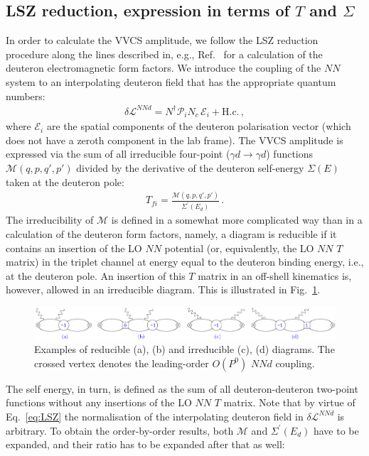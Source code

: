 \documentclass[prl,
twocolumn,
showpacs,preprintnumbers,amsmath,amssymb,
superscriptaddress,
a4paper,nofootinbib,longbibliography]{revtex4-2}
\begin{document}
\subsection{LSZ reduction, expression in terms of $T$ and $\Sigma$}
In order to calculate the VVCS amplitude, we follow the LSZ reduction procedure along the lines described in, e.g., Ref.~\cite{Kaplan:1998sz} for a calculation of the deuteron electromagnetic form factors. We introduce the coupling of the $NN$ system to an interpolating deuteron field that has the appropriate quantum numbers:
\begin{align}
    \delta\mathcal{L}^{NNd}= N^\dagger \mathcal{P}_i N_c\, \mathcal{E}_i+\text{H.c.}\,, 
\end{align}
where $\mathcal{E}_i$ are the spatial components of the deuteron polarisation vector (which does not have a zeroth component in the lab frame). The VVCS amplitude is expressed via the sum of all irreducible four-point ($\gamma d\to \gamma d$) functions $\mathcal{M}(q,p,q',p')$ divided by the derivative of the deuteron self-energy $\Sigma(E)$ taken at the deuteron pole:
\begin{align}
    T_{fi} = \frac{\mathcal{M}(q,p,q',p')}{\Sigma^\prime(E_d)}\,.
    \label{eq:LSZ}
\end{align}
The irreducibility of $\mathcal{M}$ is defined in a somewhat more complicated way than in a calculation of the deuteron form factors, namely, a diagram is reducible if it contains an insertion of the LO $NN$ potential (or, equivalently, the LO $NN$ $T$ matrix) in the triplet channel at energy equal to the deuteron binding energy, i.e., at the deuteron pole. An insertion of this $T$ matrix in an off-shell kinematics is, however, allowed in an irreducible diagram. This is illustrated in Fig.~\ref{fig:reducible}.
\begin{figure}[htb]
    \centering
    \includegraphics[width=\textwidth]{figs/reducible.pdf}
    \caption{Examples of reducible (a), (b) and irreducible (c), (d) diagrams. The crossed vertex denotes the leading-order $O(P^0)$ $NNd$ coupling.}
    \label{fig:reducible}
\end{figure}
The self energy, in turn, is defined as the sum of all deuteron-deuteron two-point functions without any insertions of the LO $NN$ $T$ matrix. 
Note that by virtue of Eq.~\eqref{eq:LSZ} the normalisation of the interpolating deuteron field in $\delta\mathcal{L}^{NNd}$ is arbitrary. To obtain the order-by-order results, both $\mathcal{M}$ and $\Sigma^\prime(E_d)$ have to be expanded, and their ratio has to be expanded after that as well:
\end{document}
